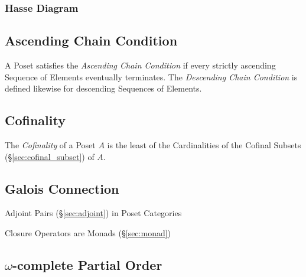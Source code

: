 \subsubsection{Hasse Diagram}\label{sec:hasse_diagram}



\subsection{Ascending Chain Condition}\label{sec:ascending_chain}

A Poset satisfies the \emph{Ascending Chain Condition} if every
strictly ascending Sequence of Elements eventually terminates. The
\emph{Descending Chain Condition} is defined likewise for descending
Sequences of Elements.



\subsection{Cofinality}\label{sec:cofinality}

The \emph{Cofinality} of a Poset $A$ is the least of the Cardinalities
of the Cofinal Subsets (\S\ref{sec:cofinal_subset}) of $A$.



\subsection{Galois Connection}\label{sec:galois_connection}

Adjoint Pairs (\S\ref{sec:adjoint}) in Poset Categories

Closure Operators are Monads (\S\ref{sec:monad})



\subsection{$\omega$-complete Partial Order}\label{sec:omega_cpo}

